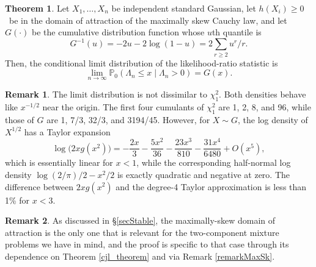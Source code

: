 \documentclass[11pt]{article}
\theoremstyle{definition}
\newtheorem{theorem}{Theorem}[section]
\newtheorem{remark}{Remark}[section]
\def\Prob{{\mathbb P}}
\def\given{\mid}
\begin{document}
\begin{theorem}\label{LR_limit}
	Let $X_1,\ldots, X_n$ be independent standard Gaussian,
	let $h(X_i) \ge 0$~be in the domain of attraction of the maximally skew Cauchy law, and
	let $G(\cdot)$ be the cumulative distribution function whose $u$th quantile is
	\begin{equation}\label{u-quantile}
	G^{-1}(u) = -2u - 2\log(1-u) = 2\sum_{r \ge 2} u^r/r.
	\end{equation}
	Then, the conditional limit distribution of the likelihood-ratio statistic is
	\[
	\lim_{n\to \infty} \Prob_0(\Lambda_n \le x \given \Lambda_n > 0) = G(x).
	\]
\end{theorem}

\begin{remark}
	The limit distribution is not dissimilar to $\chi_1^2$.  
	Both densities behave like $x^{-1/2}$ near the origin. The first four cumulants of $\chi_1^2$ are 1, 2, 8, and 96, while those of $G$ are 1, 7/3, 32/3, and 3194/45. However, for $X \sim G$, the log density of $X^{1/2}$ has a Taylor expansion
	\[
	\log\bigl(2 x g(x^2)\bigr) = -\frac{2x} 3 - \frac{5x^2}{36} - \frac{23 x^3}{810} - \frac{31 x^4}{6480} + O(x^5),
	\]
	which is essentially linear for $x < 1$, while the corresponding half-normal log density $\log(2/\pi)/2 - x^2/2$ is exactly quadratic and negative at zero.
	The difference between $2xg(x^2)$ and the degree-4 Taylor approximation is less than 1\% for $x < 3$.
\end{remark}

\begin{remark}
	As discussed in \S \ref{secStable}, the maximally-skew domain of attraction is the only one that is relevant for the two-component mixture problems we have in mind, and the proof is specific to that case through its dependence on Theorem \ref{cjl_theorem} and via Remark \ref{remarkMaxSk}.
\end{remark}
\end{document}
